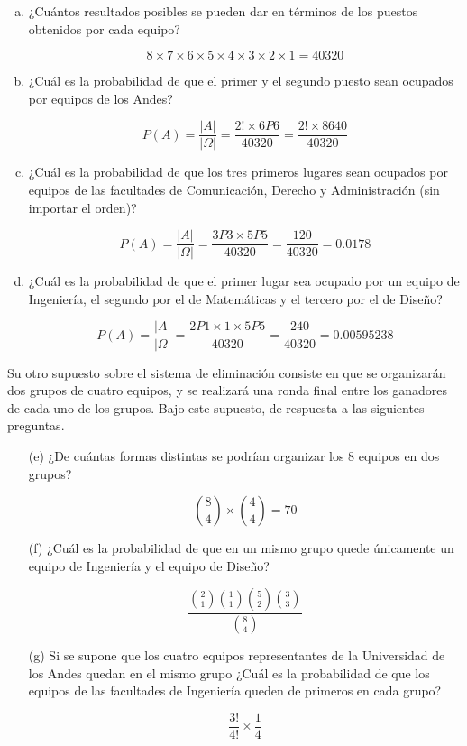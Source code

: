 \documentclass[11pt, spanish]{article}
\begin{document}
\begin{enumerate}[(a)]
\item ¿Cuántos resultados posibles se pueden dar en términos de los puestos obtenidos
por cada equipo?

$$8 \times 7 \times 6 \times 5 \times 4 \times 3 \times 2 \times 1 = 40320$$

\item ¿Cuál es la probabilidad de que el primer y el segundo puesto sean ocupados por
equipos de los Andes?

$$P(A) = \frac{|A|}{|\Omega|} = \frac{2! \times 6P6}{40320} = \frac{2! \times 8640}{40320}$$

\item ¿Cuál es la probabilidad de que los tres primeros lugares sean ocupados por equipos
de las facultades de Comunicación, Derecho y Administración (sin importar el orden)?

$$P(A) = \frac{|A|}{|\Omega|} = \frac{3P3 \times 5P5}{40320} = \frac{120}{40320} = 0.0178$$

\item ¿Cuál es la probabilidad de que el primer lugar sea ocupado por un equipo de
Ingeniería, el segundo por el de Matemáticas y el tercero por el de Diseño?

$$P(A) = \frac{|A|}{|\Omega|} = \frac{2P1 \times 1 \times 5P5}{40320} = \frac{240}{40320} = 0.00595238$$
\end{enumerate}



Su otro supuesto sobre el sistema de eliminación consiste en que se organizarán dos grupos de
cuatro equipos, y se realizará una ronda final entre los ganadores de cada uno de los grupos. Bajo
este supuesto, de respuesta a las siguientes preguntas.

\begin{itemize}
\item[(e)] ¿De cuántas formas distintas se podrían organizar los 8 equipos en dos grupos?

$$\binom{8}{4} \times \binom{4}{4} = 70$$

\item[(f)]  ¿Cuál es la probabilidad de que en un mismo grupo quede únicamente un equipo de
Ingeniería y el equipo de Diseño?

$$\frac{\binom{2}{1}\binom{1}{1}\binom{5}{2}\binom{3}{3}}{\binom{8}{4}}$$

\item[(g)]  Si se supone que los cuatro equipos representantes de la Universidad de los Andes
quedan en el mismo grupo ¿Cuál es la probabilidad de que los equipos de las facultades de
Ingeniería queden de primeros en cada grupo?

$$\frac{3!}{4!} \times \frac{1}{4}$$
\end{itemize}
\end{document}
